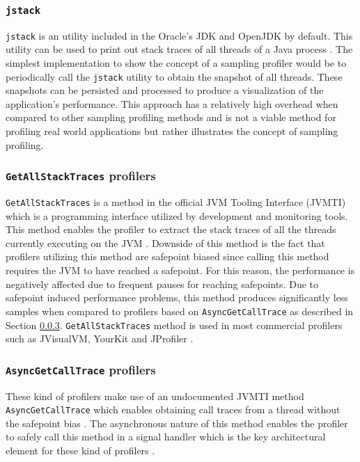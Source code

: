 \documentclass[..thesis.tex]{subfiles}
\begin{document}
\subsubsection{\texttt{jstack}}
\texttt{jstack} is an utility included in the Oracle's JDK and OpenJDK by default. This utility can be used to print out stack traces of all threads of a Java process \cite{jstack}. The simplest implementation to show the concept of a sampling profiler would be to periodically call the \texttt{jstack} utility to obtain the snapshot of all threads. These snapshots can be persisted and processed to produce a visualization of the application's performance. This approach has a relatively high overhead when compared to other sampling profiling methods and is not a viable method for profiling real world applications but rather illustrates the concept of sampling profiling.

\subsubsection{\texttt{GetAllStackTraces} profilers}
\texttt{GetAllStackTraces} is a method in the official JVM Tooling Interface (JVMTI) which is a programming interface utilized by development and monitoring tools. This method enables the profiler to extract the stack traces of all the threads currently executing on the JVM \cite{jvmtm}. Downside of this method is the fact that profilers utilizing this method are safepoint biased since calling this method requires the JVM to have reached a safepoint. For this reason, the performance is negatively affected due to frequent pauses for reaching safepoints.
Due to safepoint induced performance problems, this method produces significantly less samples when compared to profilers based on \texttt{Async\-Get\-Call\-Trace} as described in Section \ref{sec:asgct}. 
\texttt{GetAllStackTraces} method is used in most commercial profilers such as JVisualVM, YourKit and JProfiler \cite{wakart_psychosomatic_2016, visualvm}.  


\subsubsection{\texttt{AsyncGetCallTrace} profilers}
\label{sec:asgct}

These kind of profilers make use of an undocumented JVMTI method \texttt{Async\-Get\-Call\-Trace} which enables obtaining call traces from a thread without the safepoint bias \cite{agct_source}. The asynchronous nature of this method enables the profiler to safely call this method in a signal handler which is the key architectural element for these kind of profilers \cite{signal-safety7}.
\end{document}
